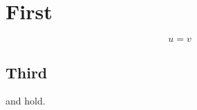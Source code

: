\documentclass{article}
\begin{document}
\section{First}\label{sec:a}
\begin{equation}\label{eq:b} u = v \end{equation}
\subsection{Third}\label{sec:c}
 and  hold.
\end{document}
